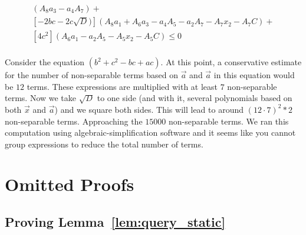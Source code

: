 \documentclass[UKenglish]{lipics-v2019}
\begin{document}
\begin{align*}
[ b^2 - 2b\sqrt{D} + D](A_8 a_3-a_4 A_7) + \\
[-2bc -2c\sqrt{D})](A_8 a_1+ A_6 a_3 - a_4 A_5- a_2 A_7 - A_7x_2 - A_7 C) + \\
[4c^2](A_6 a_1- a_2 A_5 - A_5 x_2 - A_5 C) \le 0 \\
\end{align*}

Consider the equation $(b^2 + c^2 - bc + ac)$. At this point, a conservative estimate for the number of non-separable terms based on $\vec{a}$ and $\vec{a}$ in this equation would be $12$ terms. These expressions are multiplied with at least $7$ non-separable terms. Now we take $\sqrt{D}$ to one side (and with it, several polynomials based on both $\vec{x}$ and $\vec{a}$) and we square both sides. This will lead to around $(12\cdot 7)^2 * 2$ non-separable terms. Approaching the $15000$ non-separable terms. We ran this computation using algebraic-simplification software and it seems like you cannot group expressions to reduce the total number of terms.







\section{Omitted Proofs}
\label{App:Omitted_Proofs}

\subsection{Proving Lemma~\ref{lem:query_static}}






\end{document}
